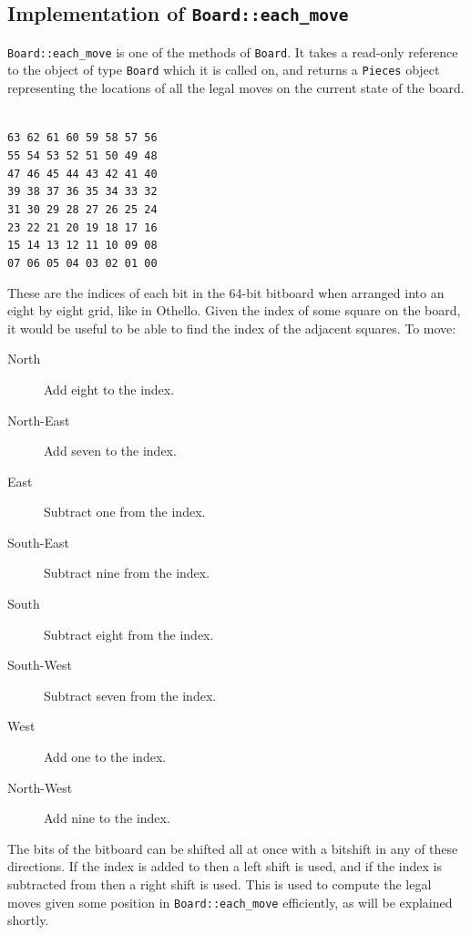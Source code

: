 \documentclass[12pt, a4paper]{report}
\begin{document}
\subsection{Implementation of \texttt{Board::each\_move}}
\texttt{Board::each\_move} is one of the methods of \texttt{Board}. It takes a read-only reference to the object of type \texttt{Board} which it is called on, and returns a \texttt{Pieces} object representing the locations
of all the legal moves on the current state of the board.

\begin{centering}
\texttt{                          \\
63 62 61 60 59 58 57 56 \\
55 54 53 52 51 50 49 48 \\
47 46 45 44 43 42 41 40 \\
39 38 37 36 35 34 33 32 \\
31 30 29 28 27 26 25 24 \\
23 22 21 20 19 18 17 16 \\
15 14 13 12 11 10 09 08 \\
07 06 05 04 03 02 01 00 \\
}
\end{centering}
These are the indices of each bit in the 64-bit bitboard when arranged into an eight by eight grid, like in Othello. Given the index of some square on the board, it would be useful to be able to find the index of 
the adjacent squares. To move:
\begin{description}
	\item[North] Add eight to the index.
	\item[North-East] Add seven to the index.
	\item[East] Subtract one from the index.
	\item[South-East] Subtract nine from the index.
	\item[South] Subtract eight from the index.
	\item[South-West] Subtract seven from the index.
	\item[West] Add one to the index.
	\item[North-West] Add nine to the index.
\end{description}
The bits of the bitboard can be shifted all at once with a bitshift in any of these directions. If the index is added to then a left shift is used, and if the index is subtracted from then a right shift is used.
This is used to compute the legal moves given some position in \texttt{Board::each\_move} efficiently, as will be explained shortly.
\end{document}
